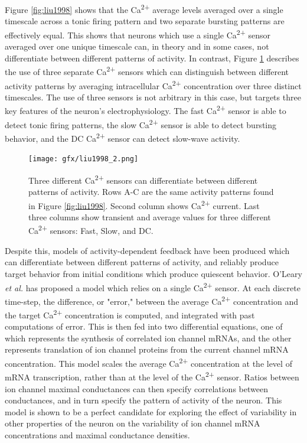 Figure \ref{fig:liu1998} shows that the Ca\textsuperscript{2+} average levels averaged over a single timescale across a tonic firing pattern and two separate bursting patterns are effectively equal. This shows that neurons which use a single Ca\textsuperscript{2+} sensor averaged over one unique timescale can, in theory and in some cases, not differentiate between different patterns of activity.
In contrast, Figure \ref{fig:liu1998_2} describes the use of three separate Ca\textsuperscript{2+} sensors which can distinguish between different activity patterns by averaging intracellular Ca\textsuperscript{2+} concentration over three distinct timescales.
The use of three sensors is not arbitrary in this case, but targets three key features of the neuron's electrophysiology. The fast Ca\textsuperscript{2+} sensor is able to detect tonic firing patterns, the slow Ca\textsuperscript{2+} sensor is able to detect bursting behavior, and the DC Ca\textsuperscript{2+} sensor can detect slow-wave activity.

\begin{figure}[H]
    \centering
    \texttt{[image: gfx/liu1998\_2.png]}
    \caption[Activity pattern differentiation in a multiple Ca\textsuperscript{2+} sensor setup]{Three different Ca\textsuperscript{2+} sensors can differentiate between different patterns of activity. Rows \textsc{A-C} are the same activity patterns found in Figure \ref{fig:liu1998}. Second column shows Ca\textsuperscript{2+} current. Last three columns show transient and average values for three different Ca\textsuperscript{2+} sensors: Fast, Slow, and DC\cite{liu_model_1998}.}
    \label{fig:liu1998_2}
\end{figure}

Despite this, models of activity-dependent feedback have been produced which can differentiate between different patterns of activity, and reliably produce target behavior from initial conditions which produce quiescent behavior\cite{oleary_correlations_2013,oleary_cell_2014}. O'Leary \textit{et al.} has proposed a model which relies on a single Ca\textsuperscript{2+} sensor. At each discrete time-step, the difference, or "error," between the average Ca\textsuperscript{2+} concentration and the target Ca\textsuperscript{2+} concentration is computed, and integrated with past computations of error\cite{oleary_cell_2014}. This is then fed into two differential equations, one of which represents the synthesis of correlated ion channel mRNAs, and the other represents translation of ion channel proteins from the current channel mRNA concentration. This model scales the average Ca\textsuperscript{2+} concentration at the level of mRNA transcription, rather than at the level of the Ca\textsuperscript{2+} sensor. Ratios between ion channel maximal conductances can then specify correlations between conductances, and in turn specify the pattern of activity of the neuron. This model is shown to be a perfect candidate for exploring the effect of variability in other properties of the neuron on the variability of ion channel mRNA concentrations and maximal conductance densities.

